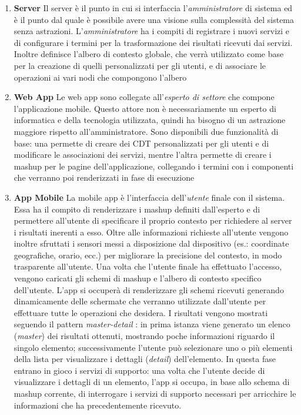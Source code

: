 \begin{enumerate}
	\item \textbf{Server}
	Il server è il punto in cui si interfaccia l'\emph{amministratore} di sistema ed è il punto dal quale è possibile avere una visione sulla complessità del sistema senza astrazioni. L'\emph{amministratore} ha i compiti di registrare i nuovi servizi e di configurare i termini per la trasformazione dei risultati ricevuti dai servizi. Inoltre definisce l'albero di contesto globale, che verrà utilizzato come base per la creazione di quelli personalizzati per gli utenti, e di associare le operazioni ai vari nodi che compongono l'albero
	\item \textbf{Web App}
	Le web app sono collegate all'\emph{esperto di settore} che compone l'applicazione mobile. Questo attore non è necessariamente un esperto di informatica e della tecnologia utilizzata, quindi ha bisogno di un astrazione maggiore rispetto all'amministratore. Sono disponibili due funzionalità di base: una permette di creare dei CDT personalizzati per gli utenti e di modificare le associazioni dei servizi, mentre l'altra permette di creare i mashup per le pagine dell'applicazione, collegando i termini con i componenti che verranno poi renderizzati in fase di esecuzione
	\item \textbf{App Mobile}
	La mobile app è l'interfaccia dell'\emph{utente} finale con il sistema. Essa ha il compito di renderizzare i mashup definiti dall'esperto e di permettere all'utente di specificare il proprio contesto per richiedere al server i risultati inerenti a esso. Oltre alle informazioni richieste all'utente vengono inoltre sfruttati i sensori messi a disposizione dal dispositivo (es.: coordinate geografiche, orario, ecc.) per migliorare la precisione del contesto, in modo trasparente all'utente.
	Una volta che l'utente finale ha effettuato l'accesso, vengono caricati gli schemi di mashup e l'albero di contesto specifico dell'utente. L'app si occuperà di renderizzare gli schemi ricevuti generando dinamicamente delle schermate che verranno utilizzate dall'utente per effettuare tutte le operazioni che desidera.
	I risultati vengono mostrati seguendo il pattern \emph{master-detail} \cite{molina2002user}: in prima istanza viene generato un elenco (\emph{master}) dei risultati ottenuti, mostrando poche informazioni riguardo il singolo elemento; successivamente l'utente può selezionare uno o più elementi della lista per visualizzare i dettagli (\emph{detail}) dell'elemento. In questa fase entrano in gioco i servizi di supporto: una volta che l'utente decide di visualizzare i dettagli di un elemento, l'app si occupa, in base allo schema di mashup corrente, di interrogare i servizi di supporto necessari per arricchire le informazioni che ha precedentemente ricevuto.
\end{enumerate}

